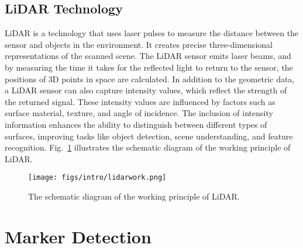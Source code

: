 \subsection{LiDAR Technology}
LiDAR is a technology that uses laser pulses to measure the distance between the sensor and objects in the environment. It creates precise three-dimensional representations of the scanned scene. 
%
The LiDAR sensor emits laser beams, and by measuring the time it takes for the reflected light to return to the sensor, the positions of 3D points in space are calculated.
%
In addition to the geometric data, a LiDAR sensor can also capture intensity values, which reflect the strength of the returned signal. These intensity values are influenced by factors such as surface material, texture, and angle of incidence. The inclusion of intensity information enhances the ability to distinguish between different types of surfaces, improving tasks like object detection, scene understanding, and feature recognition. Fig.~\ref{lidarwork} illustrates the schematic diagram of the working principle of LiDAR.
\begin{figure}[H] 
	\centering
	\texttt{[image: figs/intro/lidarwork.png]}
	\caption{ The schematic diagram of the working principle of LiDAR.
 }
	\label{lidarwork}
\end{figure}






\section{Marker Detection} \label{3.2}
\label{marker-detection}
